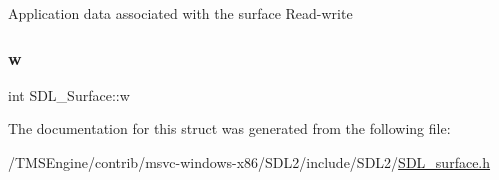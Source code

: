 Application data associated with the surface Read-\/write \mbox{\label{struct_s_d_l___surface_a9b0ec7185dcdb2a3530a9160a6ea83d9}} 
\subsubsection{\texorpdfstring{w}{w}}
{\footnotesize\ttfamily int S\+D\+L\+\_\+\+Surface\+::w}



The documentation for this struct was generated from the following file\+:\begin{DoxyCompactItemize}
\item 
/\+T\+M\+S\+Engine/contrib/msvc-\/windows-\/x86/\+S\+D\+L2/include/\+S\+D\+L2/\hyperlink{_s_d_l__surface_8h}{S\+D\+L\+\_\+surface.\+h}\end{DoxyCompactItemize}
